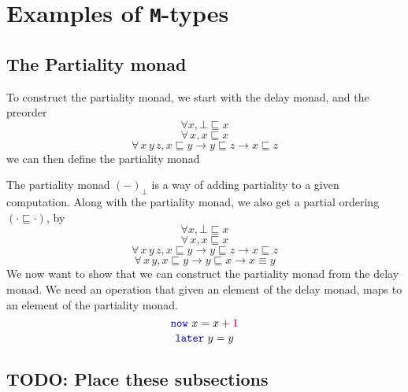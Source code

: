 \documentclass[twoside,11pt,openright]{report}
\theoremstyle{plain} %
\theoremstyle{definition}
\theoremstyle{remark}
\newcommand*{\type}[1]{\textcolor{magenta!90!black}{#1}}
\newcommand*{\unit}{\type{\textbf{1}}}
\newcommand*{\function}[1]{\textcolor{blue!60!black}{\ensuremath{\mathtt{#1}}}}
\begin{document}

\chapter{Examples of \texttt{M}-types}

\section{The Partiality monad}
To construct the partiality monad, we start with the delay monad, and the preorder
\begin{equation}
\forall x, \bot \sqsubseteq x
\end{equation}
\begin{equation}
\forall\,x, x \sqsubseteq x
\end{equation}
\begin{equation}
\forall\,x\,y\,z, x \sqsubseteq y \rightarrow y \sqsubseteq z \rightarrow x \sqsubseteq z
\end{equation}
we can then define the partiality monad

The partiality monad \((-)_\bot\) is a way of adding partiality to a given computation. Along with the partiality monad, we also get a partial ordering \((\cdot \sqsubseteq \cdot)\), by
\begin{equation}
\forall x, \bot \sqsubseteq x
\end{equation}
\begin{equation}
\forall\,x, x \sqsubseteq x
\end{equation}
\begin{equation}
\forall\,x\,y\,z, x \sqsubseteq y \rightarrow y \sqsubseteq z \rightarrow x \sqsubseteq z
\end{equation}
\begin{equation}
\forall\,x\,y, x \sqsubseteq y \rightarrow y \sqsubseteq x \rightarrow x \equiv y
\end{equation}
We now want to show that we can construct the partiality monad from the delay monad. We need an operation that given an element of the delay monad, maps to an element of the partiality monad.
\begin{equation}
  \function{now}~x = x + \unit
\end{equation}
\begin{equation}
  \function{later}~y = y
\end{equation}

\section{TODO: Place these subsections}
\end{document}

